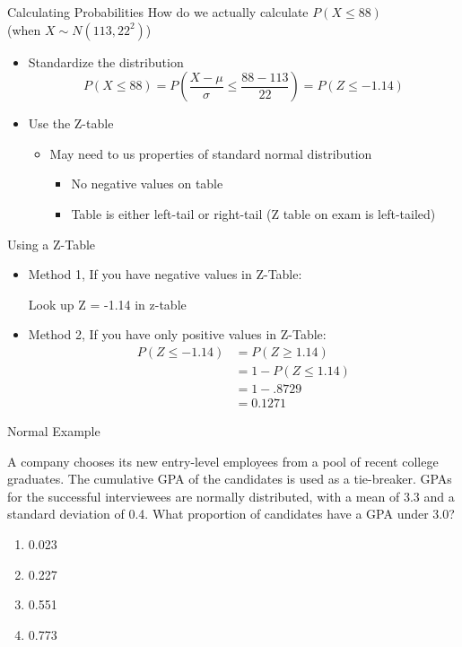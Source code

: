\documentclass{beamer}
\begin{document}
\begin{frame}{Calculating Probabilities}
	How do we actually  calculate $P(X\leq88)$ \\
	(when $X\sim N(113,22^2)$)
	
	\begin{itemize}
		\item Standardize the distribution 
		      $$P(X\leq88)=P(\frac{X-\mu}{\sigma} \leq \frac{88-113}{22}) = P(Z \leq -1.14)$$
		\item Use the Z-table
		      \begin{itemize}
		      	\item May need to us properties of standard normal distribution
		      	      \begin{itemize}
		      	      	\item No negative values on table
		      	      	\item Table is either left-tail or right-tail (\alert{Z table on exam is left-tailed})
		      	      \end{itemize}
		      \end{itemize}
	\end{itemize}
\end{frame}

\begin{frame}{Using a Z-Table}
    \begin{itemize}
        \item Method 1, If you have negative values in Z-Table: 
        
        Look up Z = -1.14 in z-table

        \item Method 2, If you have only positive values in Z-Table:
        \begin{align*}
            P(Z \leq -1.14) &= P(Z \geq 1.14) \\
            &= 1-P(Z \leq 1.14) \\
            &= 1-.8729 \\ 
            &= 0.1271
        \end{align*}
    
        
    \end{itemize}
\end{frame}

\begin{frame}{Normal Example}
	
	A company chooses its new entry-level employees from a pool of recent college graduates. The cumulative GPA of the candidates is used as a tie-breaker. GPAs for the successful interviewees are normally distributed, with a mean of 3.3 and a standard deviation of 0.4. What proportion of candidates have a GPA under 3.0?
	
	\begin{enumerate}[label=(\alph*)]
		\item 0.023%
		\item 0.227
		\item 0.551
		\item 0.773
	\end{enumerate}
	
\end{frame}
\end{document}
